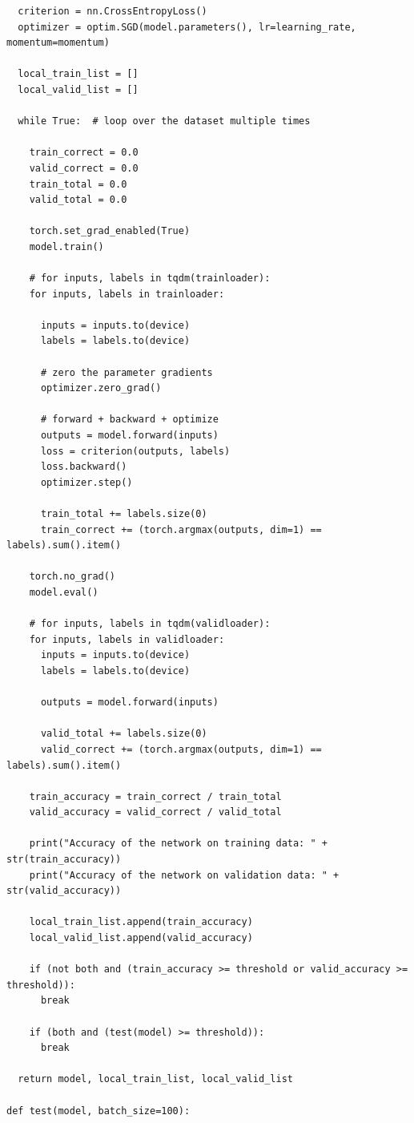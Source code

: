 \documentclass{article}
\newcommand{\1}{\mathbf{1}}
\begin{document}
{\begin{verbatim}
  criterion = nn.CrossEntropyLoss()
  optimizer = optim.SGD(model.parameters(), lr=learning_rate, momentum=momentum)

  local_train_list = []
  local_valid_list = []

  while True:  # loop over the dataset multiple times

    train_correct = 0.0
    valid_correct = 0.0
    train_total = 0.0
    valid_total = 0.0

    torch.set_grad_enabled(True)
    model.train()

    # for inputs, labels in tqdm(trainloader):
    for inputs, labels in trainloader:

      inputs = inputs.to(device)
      labels = labels.to(device)

      # zero the parameter gradients
      optimizer.zero_grad()

      # forward + backward + optimize
      outputs = model.forward(inputs)
      loss = criterion(outputs, labels)
      loss.backward()
      optimizer.step()
        
      train_total += labels.size(0)
      train_correct += (torch.argmax(outputs, dim=1) == labels).sum().item()
    
    torch.no_grad()
    model.eval()

    # for inputs, labels in tqdm(validloader):
    for inputs, labels in validloader:
      inputs = inputs.to(device)
      labels = labels.to(device)

      outputs = model.forward(inputs)
        
      valid_total += labels.size(0)
      valid_correct += (torch.argmax(outputs, dim=1) == labels).sum().item()

    train_accuracy = train_correct / train_total
    valid_accuracy = valid_correct / valid_total

    print("Accuracy of the network on training data: " + str(train_accuracy))
    print("Accuracy of the network on validation data: " + str(valid_accuracy))

    local_train_list.append(train_accuracy)
    local_valid_list.append(valid_accuracy)
    
    if (not both and (train_accuracy >= threshold or valid_accuracy >= threshold)):
      break
    
    if (both and (test(model) >= threshold)):
      break

  return model, local_train_list, local_valid_list

def test(model, batch_size=100):


\end{verbatim}}
\end{document}
